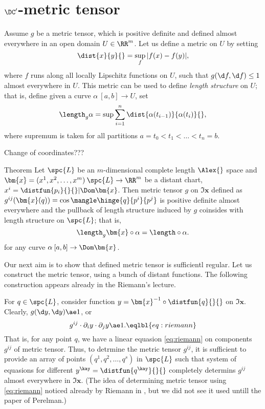 \qeds

\section{$\DC'$-metric tensor}

Assume $g$ be a metric tensor,
which is positive definite and defined almost everywhere in an open domain $U\in\RR^m$.
Let us define a metric on $U$ by setting
\[\dist{x}{y}{}
=
\sup_f{|f(x)-f(y)|},\]
where $f$ runs along all locally Lipschitz functions on $U$, such that $g(\d f,\d f)\le 1$ almost everywhere in $U$.
This metric can be used to define \emph{length structure} on $U$;
that is, define given a curve $\alpha\:[a,b]\to U$, 
set 
\[\length_g\alpha=\sup\sum_{i=1}^n\dist{\alpha(t_{i-1})}{\alpha(t_{i})}{},\]
where supremum is taken for all partitions $a=t_0<t_1<\dots<t_n=b$.

Change of coordinates???

\begin{thm}{Theorem}
Let $\spc{L}$ be an $m$-dimensional complete length $\Alex{}$ space 
and $\bm{x}=(x^1,x^2,\dots,x^m)\:\spc{L}\to\RR^m$ be a distant chart, $x^i=\distfun{p_i}{}{}|{\Dom \bm{x}}$.
Then metric tensor $g$ on $\Im\bm{x}$
defined as $g^{ij}(\bm{x}(q))=\cos\mangle\hinge{q}{p^i}{p^j}$ 
is positive definite almost everywhere 
and the pullback of length structure induced  by $g$ 
coinsides with length structure on $\spc{L}$;
that is, 
\[\length_g\bm{x}\circ\alpha=\length\circ\alpha.\] 
for any curve $\alpha\:[a,b]\to \Dom\bm{x}$.
\end{thm}

Our next aim is to show that defined metric tensor is sufficientl regular.
Let us construct the metric tensor, using a bunch of distant functions.
The following construction appears already in the Riemann's lecture. 

For $q\in\spc{L}$,
consider function $y=\bm{x}^{-1}\circ\distfun{q}{}{}$ on $\Im\bm{x}$.
Clearly, 
$g(\d y,\d y)\ae1$, 
or
\[g^{ij}\cdot\partial_iy\cdot\partial_jy
\ae
1.
\eqlbl{eq:riemann}\]
That is, for any point $q$,
we have a linear equasion \ref{eq:riemann} on components $g^{ij}$ of metric tensor.
Thus, to detrmine the metric tensor $g^{ij}$, 
it is sufficient to provide an array of points $(q^1,q^2,\dots, q^s)$ in $\spc{L}$ 
such that system of equasions for different $y^\kay=\distfun{q^\kay}{}{}$ 
completely determins $g^{ij}$ almost everywhere in $\Im\bm{x}$.
(The idea of determining metric tensor using \ref{eq:riemann}
noticed already by Riemann in \cite{riemann},
but we did not see it used untill the paper of Perelman.)


